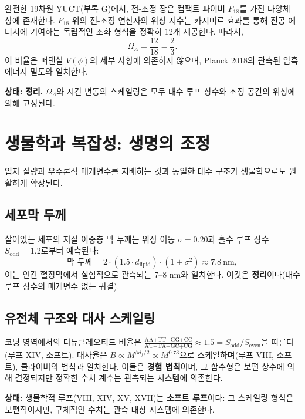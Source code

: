 \documentclass[12pt,a4paper]{article}
\begin{document}
	완전한 19차원 YUCT(부록 G)에서, 전-조정 장은 컴팩트 파이버 \(F_{18}\)를 가진 다양체 상에 존재한다. \(F_{18}\) 위의 전-조정 연산자의 위상 지수는 카시미르 효과를 통해 진공 에너지에 기여하는 독립적인 조화 형식을 정확히 \(12\)개 제공한다. 따라서,
	\begin{equation}
		\boxed{\Omega_\Lambda = \frac{12}{18} = \frac{2}{3}}.
		\label{eq:OmegaLambda}
	\end{equation}
	이 비율은 퍼텐셜 \(V(\phi)\)의 세부 사항에 의존하지 않으며, Planck 2018의 관측된 암흑 에너지 밀도와 일치한다.
	
	\textbf{상태:} \textbf{정리.} \(\Omega_\Lambda\)와 시간 변동의 스케일링은 모두 대수 루프 상수와 조정 공간의 위상에 의해 고정된다.
	
	\section{생물학과 복잡성: 생명의 조정}
	\label{sec:biology}
	
	입자 질량과 우주론적 매개변수를 지배하는 것과 동일한 대수 구조가 생물학으로도 원활하게 확장된다.
	
	\subsection{세포막 두께}
	
	살아있는 세포의 지질 이중층 막 두께는 위상 이동 \(\sigma = 0.20\)과 홀수 루프 상수 \(S_{\mathrm{odd}} = 1.2\)로부터 예측된다:
	\[
	\text{막 두께} = 2 \cdot (1.5 \cdot d_{\mathrm{lipid}}) \cdot (1 + \sigma^2) \approx 7.8\ \mathrm{nm},
	\]
	이는 인간 혈장막에서 실험적으로 관측되는 7--8 nm와 일치한다. 이것은 \textbf{정리}이다(대수 루프 상수의 매개변수 없는 귀결).
	
	\subsection{유전체 구조와 대사 스케일링}
	
	코딩 영역에서의 디뉴클레오티드 비율은 \(\frac{\text{AA+TT+GG+CC}}{\text{AT+TA+GC+CG}} \approx 1.5 = S_{\mathrm{odd}}/S_{\mathrm{even}}\)을 따른다(루프 XIV, 소프트). 대사율은 \(B \propto M^{\beta d_f/2} \propto M^{0.73}\)으로 스케일하며(루프 VIII, 소프트), 클라이버의 법칙과 일치한다. 이들은 \textbf{경험 법칙}이며, 그 함수형은 보편 상수에 의해 결정되지만 정확한 수치 계수는 관측되는 시스템에 의존한다.
	
	\textbf{상태:} 생물학적 루프(VIII, XIV, XV, XVII)는 \textbf{소프트 루프}이다: 그 스케일링 형식은 보편적이지만, 구체적인 수치는 관측 대상 시스템에 의존한다.
	
\end{document}
